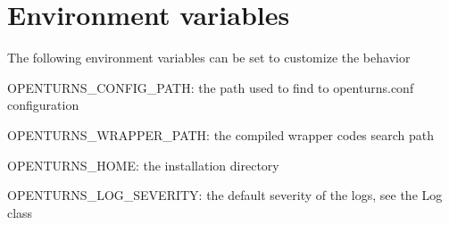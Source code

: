 \documentclass[11pt,a4paper]{article}
\begin{document}
\thispagestyle{empty}


\newpage



\tableofcontents

\newpage

\newpage
\section{Environment variables}

The following environment variables can be set to customize the behavior
\begin{description}
\item OPENTURNS\_CONFIG\_PATH: the path used to find to openturns.conf configuration
\item OPENTURNS\_WRAPPER\_PATH: the compiled wrapper codes search path
\item OPENTURNS\_HOME: the installation directory
\item OPENTURNS\_LOG\_SEVERITY: the default severity of the logs, see the Log class
\end{description}






















\ifpdf
\clearpage
{}
{}
\fi
\printindex
\end{document}
